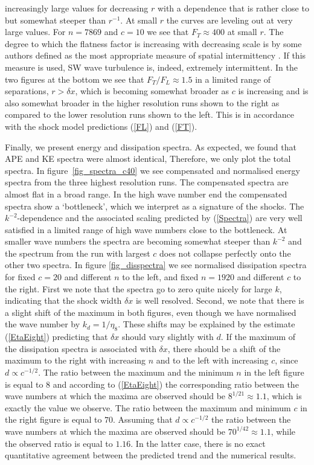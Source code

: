 \documentclass{jfm}
\begin{document}
increasingly large values for decreasing $ r $ with a dependence that is rather
close to but somewhat steeper than $ r^{-1} $. At small $ r $ the curves are
leveling out at very large values. For $ n = 7869 $ and $ c = 10 $ we see that
$ F_{T} \approx 400 $ at small $ r $. The degree to which the flatness factor
is increasing with decreasing scale is by some authors defined as the most
appropriate measure of spatial intermittency \cite[see for example][]{Frisch}.
If this measure is used, SW wave turbulence is, indeed, extremely intermittent.
In the two figures at the bottom we see that $ F_{T}/F_{L} \approx 1.5 $ in a
limited range of separations, $ r > \delta x $, which is becoming somewhat
broader as $ c $ is increasing and is also somewhat broader in the higher
resolution runs shown to the right as compared to the lower resolution runs
shown to the left. This is in accordance with the shock model predictions
(\ref{FL}) and (\ref{FT}).

Finally, we present energy and dissipation spectra. As expected, we found that APE and KE
spectra were almost identical, Therefore, we only plot the
total spectra. In figure~\ref{fig_spectra_c40} we see  compensated and
normalised energy spectra from the three highest resolution runs. The
compensated spectra are almost flat in a broad range. In the high wave number
end the compensated spectra show a `bottleneck', which we interpret as a
signature of the shocks. The $ k^{-2} $-dependence and the associated scaling predicted
by (\ref{Spectra}) are very well satisfied in a limited range of high wave
numbers close to the bottleneck. At smaller wave numbers the spectra are
becoming somewhat steeper than $ k^{-2} $ and the spectrum from the run with
largest $ c $ does not collapse perfectly onto the other two spectra.  In figure \ref{fig_disspectra}
 we see normalised dissipation spectra for fixed $ c= 20 $ and different $ n $ to the left, and fixed $ n = 1920 $
and different $ c $ to the right. First we note that the spectra go to zero quite nicely for large $ k $, indicating that the shock width $ \delta x $ is well resolved. Second, we note that there is a slight shift of the maximum in both figures, even though we have normalised the wave number by $ k_d = 1/\eta_8 $.   These shifts may be explained by the estimate (\ref{EtaEight}) predicting that $ \delta x $ should vary slightly with $ d $. If the maximum of the dissipation spectra is associated with $ \delta x $, there should be a shift of the maximum  to the right with increasing $ n $ and to the left with increasing $ c $, since $ d \propto c^{-1/2} $.
 The ratio between the maximum and the minimum $ n $ in the left figure is equal to 8 and  according to (\ref{EtaEight}) the corresponding ratio between the wave numbers at which the maxima are observed should be $ 8^{1/21} \approx 1.1 $, which is exactly the value we observe. The ratio between the maximum and minimum $ c $ in the right figure is equal to $ 70 $. Assuming that $ d \propto c^{-1/2} $ the ratio between the wave numbers at which the maxima are observed should be $ 70^{1/42} \approx 1.1 $, while the observed ratio is equal to $ 1.16 $. In the latter case, there is no exact quantitative agreement between the predicted trend and the numerical results.
\end{document}
